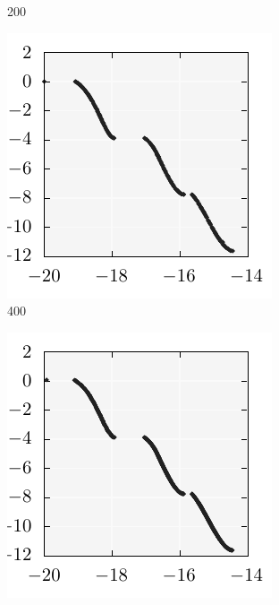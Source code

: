 \documentclass{stdlocal}
\begin{document}
\begin{figure}[t]
\begin{subfigure}[b]{0.24\textwidth}
        \caption{200}
      \end{subfigure}
      \begin{subfigure}[b]{0.24\textwidth}
        \center
        \includegraphics[width=\textwidth]{../../plots/kursawe_400.pdf}
        \caption{400}
      \end{subfigure}
      \begin{subfigure}[b]{0.24\textwidth}
        \center
        \includegraphics[width=\textwidth]{../../plots/kursawe_1000.pdf}

\end{subfigure}
\end{figure}
\end{document}
